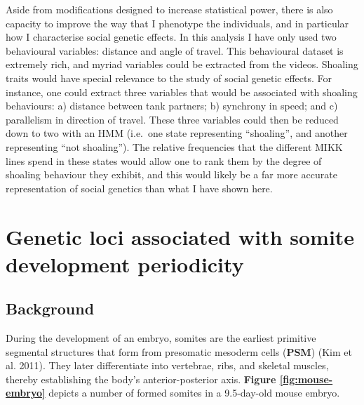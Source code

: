 \documentclass[
]{book}
\begin{document}
Aside from modifications designed to increase statistical power, there is also capacity to improve the way that I phenotype the individuals, and in particular how I characterise social genetic effects. In this analysis I have only used two behavioural variables: distance and angle of travel. This behavioural dataset is extremely rich, and myriad variables could be extracted from the videos. Shoaling traits would have special relevance to the study of social genetic effects. For instance, one could extract three variables that would be associated with shoaling behaviours: a) distance between tank partners; b) synchrony in speed; and c) parallelism in direction of travel. These three variables could then be reduced down to two with an HMM (i.e.~one state representing ``shoaling'', and another representing ``not shoaling''). The relative frequencies that the different MIKK lines spend in these states would allow one to rank them by the degree of shoaling behaviour they exhibit, and this would likely be a far more accurate representation of social genetics than what I have shown here.

\hypertarget{Somite-chap}{%
\chapter{Genetic loci associated with somite development periodicity}\label{Somite-chap}}

\hypertarget{background}{%
\section{Background}\label{background}}

During the development of an embryo, somites are the earliest primitive segmental structures that form from presomatic mesoderm cells (\textbf{PSM}) (Kim et al. 2011). They later differentiate into vertebrae, ribs, and skeletal muscles, thereby establishing the body's anterior-posterior axis. \textbf{Figure \ref{fig:mouse-embryo}} depicts a number of formed somites in a 9.5-day-old mouse embryo.
\end{document}
